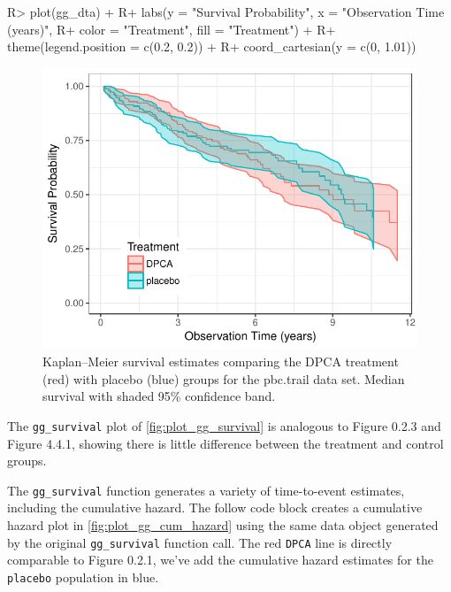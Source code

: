\documentclass[article]{jss}
\begin{document}
\begin{Schunk}
\begin{Sinput}
R> plot(gg_dta) +
R+   labs(y = "Survival Probability", x = "Observation Time (years)",
R+        color = "Treatment", fill = "Treatment") +
R+   theme(legend.position = c(0.2, 0.2)) +
R+   coord_cartesian(y = c(0, 1.01))
\end{Sinput}
\begin{figure}[!htb]

{\centering \includegraphics{rfs-plot_gg_survival-1} 

}

\caption[Kaplan--Meier survival estimates comparing the DPCA treatment (red) with placebo (blue) groups for the pbc.trail data set]{Kaplan--Meier survival estimates comparing the DPCA treatment (red) with placebo (blue) groups for the pbc.trail data set. Median survival with shaded 95\% confidence band.}\label{fig:plot_gg_survival}
\end{figure}
\end{Schunk}

The \texttt{gg\_survival} plot of \autoref{fig:plot_gg_survival} is
analogous to\citep{fleming:1991} Figure 0.2.3 and Figure 4.4.1, showing
there is little difference between the treatment and control groups.

The \texttt{gg\_survival} function generates a variety of time-to-event
estimates, including the cumulative hazard. The follow code block
creates a cumulative hazard plot \cite[Figure 0.2.1]{fleming:1991} in
\autoref{fig:plot_gg_cum_hazard} using the same data object generated by
the original \texttt{gg\_survival} function call. The red \texttt{DPCA}
line is directly comparable to Figure 0.2.1, we've add the cumulative
hazard estimates for the \texttt{placebo} population in blue.
\end{document}

